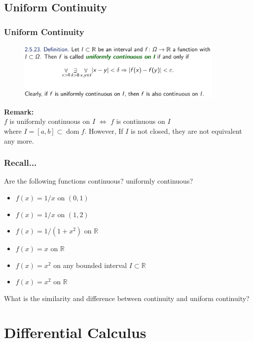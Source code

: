 \documentclass[10pt, t]{beamer}
\newcommand{\R}{\mathbb{R}}
\newcommand{\dom}{\operatorname{dom}}
\begin{document}
\subsection{Uniform Continuity}
\begin{frame}
    \frametitle{Uniform Continuity}

    \begin{figure}[H]
        \centering
        \includegraphics[width=0.9\textwidth]{2020-10-28-12-30-39.png}
    \end{figure}
    \textbf{Remark:} \\$f$ is uniformly continuous on $I$ $\Leftrightarrow$ $f$ is continuous on $I$\\ where $I=[a,b]\subset \dom f$. However,
        If $I$ is not closed, they are not equivalent any more.
\end{frame}

\begin{frame}
    \frametitle{Recall...}
    Are the following functions continuous? uniformly continuous?
    \begin{itemize}
        \item $f(x)=1/x$ on $(0,1)$
        \item $f(x)=1/x$ on $(1,2)$
        \item $f(x)=1/(1+x^2)$ on $\R$
        \item $f(x)=x$ on $\R$
        \item $f(x)=x^2$ on any bounded interval $I\subset \R$
        \item $f(x)=x^2$ on $\R$
    \end{itemize}
    What is the similarity and difference between continuity and uniform continuity?
\end{frame}

\section{Differential Calculus}
\end{document}
